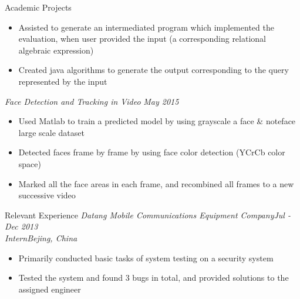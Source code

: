 \documentclass{resume} 		%
\begin{document}
\begin{rSection}{Academic Projects}
\begin{itemize}
\item Assisted to generate an intermediated program which implemented the evaluation, when user provided the input (a corresponding relational algebraic expression)
\item Created java algorithms to generate the output corresponding to the query represented by the input
 \end{itemize}
 {\sl Face Detection and Tracking in Video } \hfill {\em May 2015} 
\begin{itemize} 
 \setlength\itemsep{-0.5em}		%
 \renewcommand\labelitemi{--}		%
\item Used Matlab to train a predicted model by using grayscale a face \& noteface large scale dataset
\item Detected faces frame by frame by using face color detection (YCrCb color space)
\item Marked all the face areas in each frame, and recombined all frames to a new successive video
\end{itemize} 
\end{rSection}


\begin{rSection}{Relevant Experience}
{\sl Datang Mobile Communications Equipment Company}\hfill {\em Jul - Dec 2013}\\
{\sl Intern}\hfill {\em Bejing, China}
\begin{itemize} 
 \setlength\itemsep{-0.5em}
 \renewcommand\labelitemi{--}
\item Primarily conducted basic tasks of system testing on a security system
\item Tested the system and found 3 bugs in total, and provided solutions to the assigned engineer
\end{itemize} 
\end{rSection}
\end{document}
